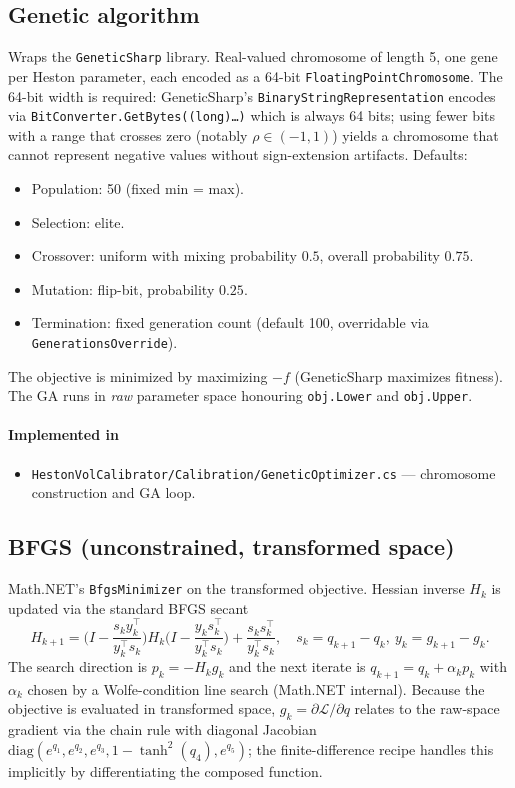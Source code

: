 \documentclass[11pt,a4paper]{article}
\begin{document}
\subsection{Genetic algorithm}
Wraps the \texttt{GeneticSharp} library. Real-valued chromosome of length 5,
one gene per Heston parameter, each encoded as a 64-bit
\texttt{FloatingPointChromosome}. The 64-bit width is required: GeneticSharp's
\texttt{BinaryStringRepresentation} encodes via \texttt{BitConverter.GetBytes((long)\dots)}
which is always 64 bits; using fewer bits with a range that crosses zero
(notably $\rho \in (-1,1)$) yields a chromosome that cannot represent negative
values without sign-extension artifacts. Defaults:
\begin{itemize}
\item Population: 50 (fixed min = max).
\item Selection: elite.
\item Crossover: uniform with mixing probability $0.5$, overall probability $0.75$.
\item Mutation: flip-bit, probability $0.25$.
\item Termination: fixed generation count (default 100, overridable via \texttt{GenerationsOverride}).
\end{itemize}
The objective is minimized by maximizing $-f$ (GeneticSharp maximizes fitness).
The GA runs in \emph{raw} parameter space honouring \texttt{obj.Lower} and
\texttt{obj.Upper}.

\paragraph*{Implemented in}
\begin{itemize}
\item \texttt{HestonVolCalibrator/Calibration/GeneticOptimizer.cs} --- chromosome construction and GA loop.
\end{itemize}

\subsection{BFGS (unconstrained, transformed space)}
Math.NET's \texttt{BfgsMinimizer} on the transformed objective. Hessian inverse
$H_k$ is updated via the standard BFGS secant
\[
H_{k+1} = \Big(I - \frac{s_k y_k^\top}{y_k^\top s_k}\Big) H_k
\Big(I - \frac{y_k s_k^\top}{y_k^\top s_k}\Big) + \frac{s_k s_k^\top}{y_k^\top s_k},
\quad
s_k = q_{k+1} - q_k,\ y_k = g_{k+1} - g_k.
\]
The search direction is $p_k = -H_k g_k$ and the next iterate is
$q_{k+1} = q_k + \alpha_k p_k$ with $\alpha_k$ chosen by a Wolfe-condition line
search (Math.NET internal). Because the objective is evaluated in
transformed space, $g_k = \partial \mathcal{L}/\partial q$ relates to the
raw-space gradient via the chain rule with diagonal Jacobian
$\mathrm{diag}(e^{q_1}, e^{q_2}, e^{q_3}, 1 - \tanh^2(q_4), e^{q_5})$; the
finite-difference recipe handles this implicitly by differentiating the composed
function.
\end{document}
